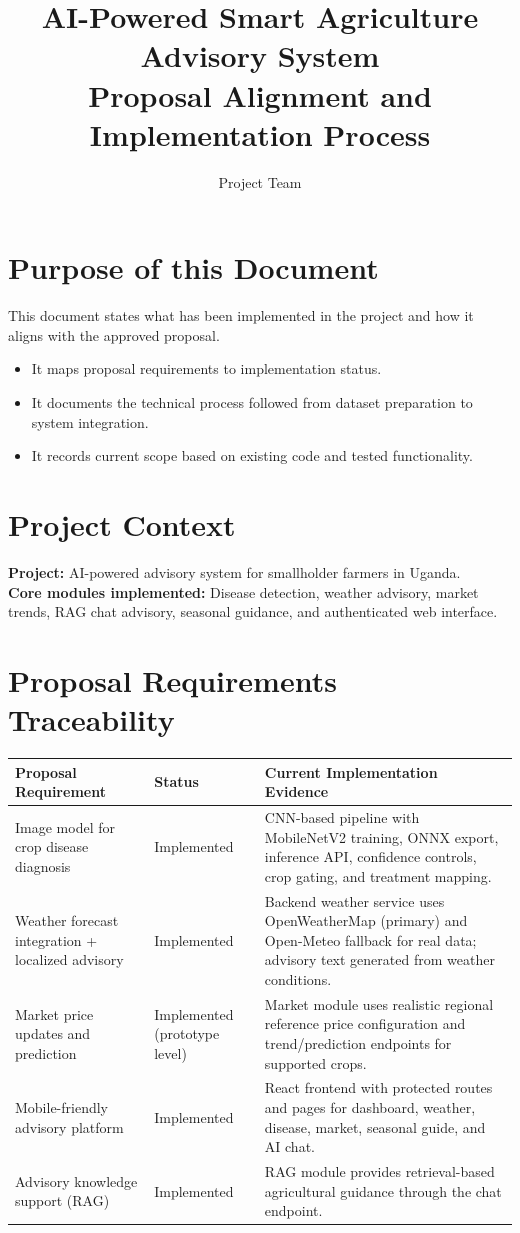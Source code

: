 \documentclass[11pt,a4paper]{article}
\title{\textbf{AI-Powered Smart Agriculture Advisory System}\\
\large Proposal Alignment and Implementation Process}
\author{Project Team}
\date{}
\begin{document}
\maketitle

\section{Purpose of this Document}
This document states what has been implemented in the project and how it aligns with the approved proposal.
\begin{itemize}[noitemsep]
  \item It maps proposal requirements to implementation status.
  \item It documents the technical process followed from dataset preparation to system integration.
  \item It records current scope based on existing code and tested functionality.
\end{itemize}

\section{Project Context}
\textbf{Project:} AI-powered advisory system for smallholder farmers in Uganda.\\
\textbf{Core modules implemented:} Disease detection, weather advisory, market trends, RAG chat advisory, seasonal guidance, and authenticated web interface.

\section{Proposal Requirements Traceability}
\begin{longtable}{p{4.7cm} p{2.8cm} p{7.9cm}}
\toprule
\textbf{Proposal Requirement} & \textbf{Status} & \textbf{Current Implementation Evidence} \\
\midrule
Image model for crop disease diagnosis & Implemented & CNN-based pipeline with MobileNetV2 training, ONNX export, inference API, confidence controls, crop gating, and treatment mapping. \\
Weather forecast integration + localized advisory & Implemented & Backend weather service uses OpenWeatherMap (primary) and Open-Meteo fallback for real data; advisory text generated from weather conditions. \\
Market price updates and prediction & Implemented (prototype level) & Market module uses realistic regional reference price configuration and trend/prediction endpoints for supported crops. \\
Mobile-friendly advisory platform & Implemented & React frontend with protected routes and pages for dashboard, weather, disease, market, seasonal guide, and AI chat. \\
Advisory knowledge support (RAG) & Implemented & RAG module provides retrieval-based agricultural guidance through the chat endpoint. \\
\bottomrule
\end{longtable}
\end{document}
